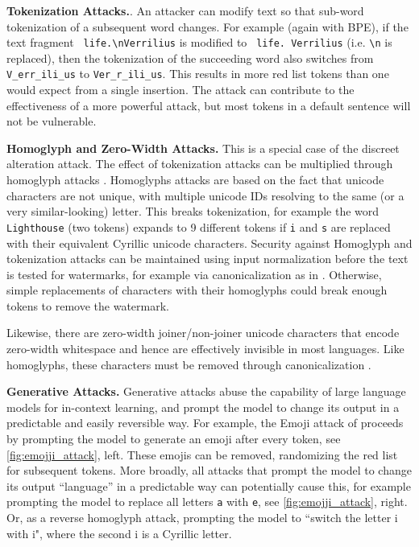 \documentclass{article}
\theoremstyle{plain}
\theoremstyle{definition}
\theoremstyle{remark}
\begin{document}
\textbf{Tokenization Attacks.}. 
An attacker can modify text so that sub-word tokenization of a subsequent word changes. For example (again with BPE), if the text fragment \texttt{ life.\textbackslash nVerrilius} is modified to \texttt{ life. Verrilius} (i.e. \texttt{\textbackslash n} is replaced), then the tokenization of the succeeding word also switches from \texttt{V\_err\_ili\_us} to \texttt{Ver\_r\_ili\_us}.  This results in more red list tokens than one would expect from a single insertion. The attack can contribute to the effectiveness of a more powerful attack, but most tokens in a default sentence will not be vulnerable. 

\textbf{Homoglyph and Zero-Width Attacks.}
  This is a special case of the discreet alteration attack.  The effect of tokenization attacks can be multiplied through homoglyph attacks \citep{gabrilovich_homograph_2002}. Homoglyphs attacks are based on the fact that unicode characters are not unique, with multiple unicode IDs resolving to the same (or a very similar-looking) letter. This breaks tokenization, for example the word \texttt{Lighthouse} (two tokens) expands to 9 different tokens if \texttt{i} and \texttt{s} are replaced with their equivalent Cyrillic unicode characters.
Security against Homoglyph and tokenization attacks can be maintained using input normalization before the text is tested for watermarks, for example via canonicalization as in \citet{helfrich_dual_2012}. 
Otherwise, simple replacements of characters with their homoglyphs could break enough tokens to remove the watermark.

Likewise, there are zero-width joiner/non-joiner unicode characters that encode zero-width whitespace and hence are effectively invisible in most languages. Like homoglyphs, these characters must be removed through canonicalization \citep{pajola_fall_2021,boucher_bad_2022}.  


\textbf{Generative Attacks.}
Generative attacks abuse the capability of large language models for in-context learning, and prompt the model to change its output in a predictable and easily reversible way. For example, the Emoji attack of \citet{goodside_there_2023} proceeds by prompting the model to generate an emoji after every token, see \cref{fig:emojji_attack}, left. These emojis can be removed, randomizing the red list for subsequent tokens. More broadly, all attacks that prompt the model to change its output ``language'' in a predictable way can potentially cause this, for example prompting the model to replace all letters \texttt{a} with \texttt{e}, see \cref{fig:emojji_attack}, right. Or, as a reverse homoglyph attack, prompting the model to ``switch the letter i with i", where the second i is a Cyrillic letter.
\end{document}
